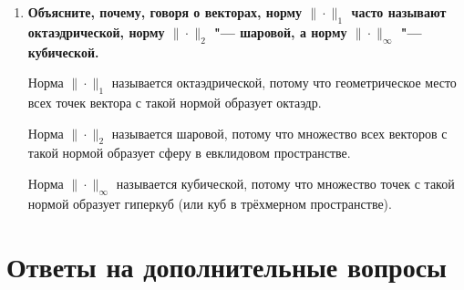 \documentclass[12pt, a4paper]{article}
\begin{document}
\begin{enumerate}
		\item \textbf{Объясните, почему, говоря о векторах, норму $\| \cdot \|_1$ часто
			называют октаэдрической, норму  $\| \cdot \|_2$ "--- шаровой, а норму
			$\| \cdot \|_{\infty}$ "--- кубической.}
		
		Норма $\|\cdot\|_1$ называется октаэдрической, потому что геометрическое место всех точек вектора с такой нормой образует октаэдр.
		
		Норма $\|\cdot\|_2$ называется шаровой, потому что множество всех векторов с такой нормой образует сферу в евклидовом пространстве.
		
		Норма $\|\cdot\|_{\infty}$ называется кубической, потому что множество точек с такой нормой образует гиперкуб (или куб в трёхмерном пространстве).
		
	\end{enumerate}
	
	\section{Ответы на дополнительные вопросы}
	
\end{document}
